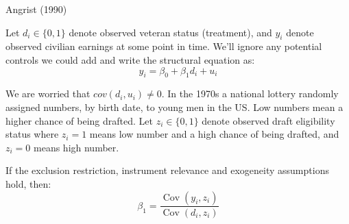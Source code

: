 \documentclass[11pt]{article}
\begin{document}
\begin{example}
    Angrist (1990)

    Let $d_i \in \{0,1\}$ denote observed veteran status (treatment), and $y_i$ denote observed civilian earnings at some point in time. We'll ignore any potential controls we could add and write the structural equation as:
    \[y_i = \beta_0 + \beta_1 d_i + u_i\]

    We are worried that $cov(d_i,u_i)\neq0$. In the 1970s a national lottery randomly assigned numbers, by birth date, to young men in the US. Low numbers mean a higher chance of being drafted. Let $z_i \in \{0,1\}$ denote observed draft eligibility status where $z_i=1$ means low number and a high chance of being drafted, and $z_i = 0$ means high number.

    If the exclusion restriction, instrument relevance and exogeneity assumptions hold, then:
    \begin{equation}
\beta_1=\frac{\operatorname{Cov}\left(y_i, z_i\right)}{\operatorname{Cov}\left(d_i, z_i\right)}
\end{equation}
\end{example}
\end{document}
